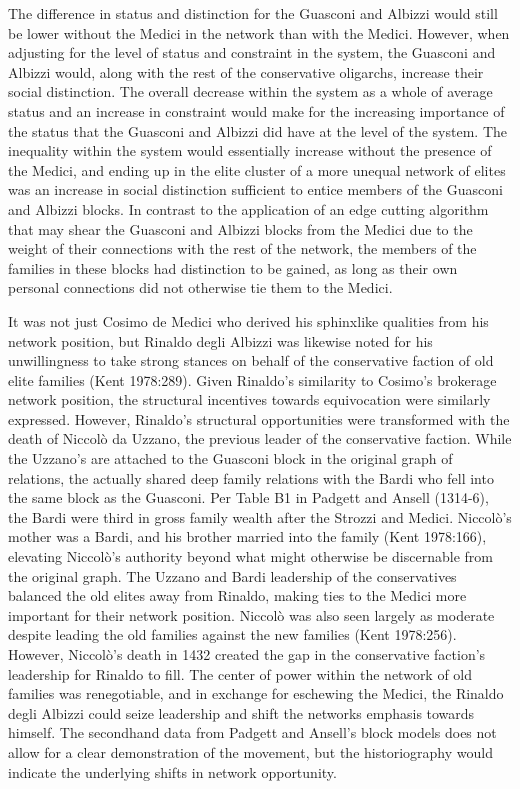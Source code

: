 \documentclass[12pt]{article}
\begin{document}
The difference in status and distinction for the Guasconi and Albizzi would still be lower without the Medici in the network than with the Medici. However, when adjusting for the level of status and constraint in the system, the Guasconi and Albizzi would, along with the rest of the conservative oligarchs, increase their social distinction. The overall decrease within the system as a whole of average status and an increase in constraint would make for the increasing importance of the status that the Guasconi and Albizzi did have at the level of the system. The inequality within the system would essentially increase without the presence of the Medici, and ending up in the elite cluster of a more unequal network of elites was an increase in social distinction sufficient to entice members of the Guasconi and Albizzi blocks. In contrast to the application of an edge cutting algorithm that may shear the Guasconi and Albizzi blocks from the Medici due to the weight of their connections with the rest of the network, the members of the families in these blocks had distinction to be gained, as long as their own personal connections did not otherwise tie them to the Medici.  

It was not just Cosimo de Medici who derived his sphinxlike qualities from his network position, but Rinaldo degli Albizzi was likewise noted for his unwillingness to take strong stances on behalf of the conservative faction of old elite families (Kent 1978:289). Given Rinaldo’s similarity to Cosimo’s brokerage network position, the structural incentives towards equivocation were similarly expressed. However, Rinaldo’s structural opportunities were transformed with the death of Niccolò da Uzzano, the previous leader of the conservative faction. While the Uzzano’s are attached to the Guasconi block in the original graph of relations, the actually shared deep family relations with the Bardi who fell into the same block as the Guasconi. Per Table B1 in Padgett and Ansell (1314-6), the Bardi were third in gross family wealth after the Strozzi and Medici. Niccolò’s mother was a Bardi, and his brother married into the family (Kent 1978:166), elevating Niccolò’s authority beyond what might otherwise be discernable from the original graph. The Uzzano and Bardi leadership of the conservatives balanced the old elites away from Rinaldo, making ties to the Medici more important for their network position. Niccolò was also seen largely as moderate despite leading the old families against the new families (Kent 1978:256). However, Niccolò’s death in 1432 created the gap in the conservative faction’s leadership for Rinaldo to fill. The center of power within the network of old families was renegotiable, and in exchange for eschewing the Medici, the Rinaldo degli Albizzi could seize leadership and shift the networks emphasis towards himself. The secondhand data from Padgett and Ansell’s block models does not allow for a clear demonstration of the movement, but the historiography would indicate the underlying shifts in network opportunity.      
\end{document}
